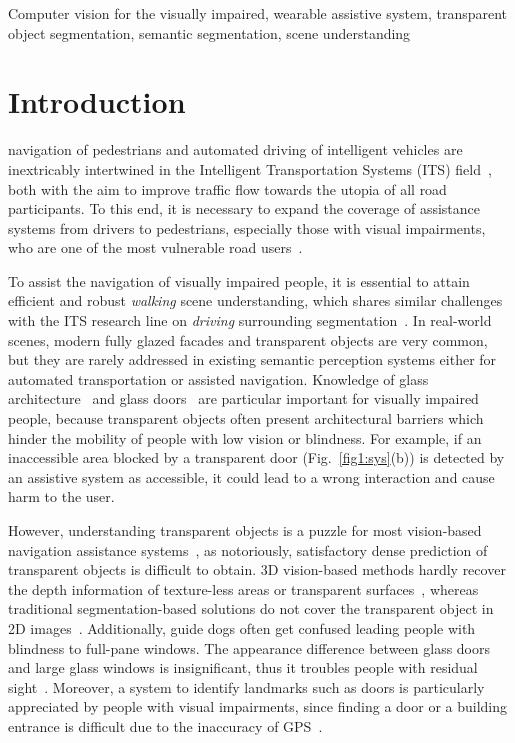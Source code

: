 \documentclass[journal]{IEEEtran}
\begin{document}
\begin{IEEEkeywords} 
Computer vision for the visually impaired, wearable assistive system, transparent object segmentation, semantic segmentation, scene understanding
\end{IEEEkeywords}

\IEEEpeerreviewmaketitle

\section{Introduction}
 navigation of pedestrians and automated driving of intelligent vehicles are inextricably intertwined in the Intelligent Transportation Systems (ITS) field~\cite{cao2020rapid,mancini2018mechatronic,mancini2015embedded,stahlschmidt2015descending,yang2018unifying,xiang2019importance}, both with the aim to improve traffic flow towards the utopia of all road participants. To this end, it is necessary to expand the coverage of assistance systems from drivers to pedestrians, especially those with visual impairments, who are one of the most vulnerable road users~\cite{manduchi2011mobility,Williams-et-al_2013}. 

To assist the navigation of visually impaired people, it is essential to attain efficient and robust \emph{walking} scene understanding, which shares similar challenges with the ITS research line on \emph{driving} surrounding segmentation~\cite{romera2017erfnet,yang2019pass,yang2020omnisupervised}. In real-world scenes, modern fully glazed facades and transparent objects are very common, but they are rarely addressed in existing semantic perception systems either for automated transportation or assisted navigation. Knowledge of glass architecture~\cite{butera2005glass} and glass doors~\cite{maringer2019suitability,mei2020don} are particular important for visually impaired people, because transparent objects often present architectural barriers which hinder the mobility of people with low vision or blindness. For example, if an inaccessible area blocked by a transparent door (Fig.~\ref{fig1:sys}(b)) is detected by an assistive system as accessible, it could lead to a wrong interaction and cause harm to the user. 

However, understanding transparent objects is a puzzle for most vision-based navigation assistance systems~\cite{aladren2014navigation,wang2017enabling,duh2020v}, as notoriously, satisfactory dense prediction of transparent objects is difficult to obtain. 3D vision-based methods hardly recover the depth information of texture-less areas or transparent surfaces~\cite{aladren2014navigation,liu2021hida}, whereas traditional segmentation-based solutions do not cover the transparent object in 2D images~\cite{yang2018unifying,lin2019deep}. Additionally, guide dogs often get confused leading people with blindness to full-pane windows. The appearance difference between glass doors and large glass windows is insignificant, thus it troubles people with residual sight~\cite{saha2019wayfinding}. Moreover, a system to identify landmarks such as doors is particularly appreciated by people with visual impairments, since finding a door or a building entrance is difficult due to the inaccuracy of GPS~\cite{saha2019wayfinding,berenguel2020floor}.
\end{document}
